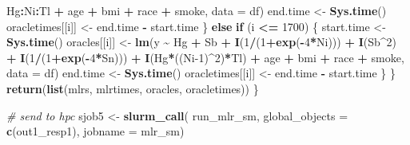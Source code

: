 \documentclass[12pt, twoside]{amherstthesis}
\newenvironment{Shaded}{\begin{snugshade}}{\end{snugshade}}
\newcommand{\AttributeTok}[1]{\textcolor[rgb]{0.13,0.29,0.53}{#1}}
\newcommand{\CommentTok}[1]{\textcolor[rgb]{0.56,0.35,0.01}{\textit{#1}}}
\newcommand{\ControlFlowTok}[1]{\textcolor[rgb]{0.13,0.29,0.53}{\textbf{#1}}}
\newcommand{\DecValTok}[1]{\textcolor[rgb]{0.00,0.00,0.81}{#1}}
\newcommand{\FunctionTok}[1]{\textcolor[rgb]{0.13,0.29,0.53}{\textbf{#1}}}
\newcommand{\NormalTok}[1]{#1}
\newcommand{\OtherTok}[1]{\textcolor[rgb]{0.56,0.35,0.01}{#1}}
\newcommand{\SpecialCharTok}[1]{\textcolor[rgb]{0.81,0.36,0.00}{\textbf{#1}}}
\newcommand{\StringTok}[1]{\textcolor[rgb]{0.31,0.60,0.02}{#1}}
\begin{document}
\begin{Shaded}
\begin{Highlighting}[]
\NormalTok{                           Hg}\SpecialCharTok{:}\NormalTok{Ni}\SpecialCharTok{:}\NormalTok{Tl }\SpecialCharTok{+} 
\NormalTok{                           age }\SpecialCharTok{+}\NormalTok{ bmi }\SpecialCharTok{+}\NormalTok{ race }\SpecialCharTok{+}\NormalTok{ smoke, }\AttributeTok{data =}\NormalTok{ df)}
\NormalTok{      end.time }\OtherTok{\textless{}{-}} \FunctionTok{Sys.time}\NormalTok{()}
\NormalTok{      oracletimes[[i]] }\OtherTok{\textless{}{-}}\NormalTok{ end.time }\SpecialCharTok{{-}}\NormalTok{ start.time}
\NormalTok{    \} }\ControlFlowTok{else} \ControlFlowTok{if}\NormalTok{ (i }\SpecialCharTok{\textless{}=} \DecValTok{1700}\NormalTok{) \{}
\NormalTok{      start.time }\OtherTok{\textless{}{-}} \FunctionTok{Sys.time}\NormalTok{()}
\NormalTok{      oracles[[i]] }\OtherTok{\textless{}{-}} \FunctionTok{lm}\NormalTok{(y }\SpecialCharTok{\textasciitilde{}}\NormalTok{ Hg }\SpecialCharTok{+}\NormalTok{ Sb }\SpecialCharTok{+}
                           \FunctionTok{I}\NormalTok{(}\DecValTok{1}\SpecialCharTok{/}\NormalTok{(}\DecValTok{1}\SpecialCharTok{+}\FunctionTok{exp}\NormalTok{(}\SpecialCharTok{{-}}\DecValTok{4}\SpecialCharTok{*}\NormalTok{Ni))) }\SpecialCharTok{+} \FunctionTok{I}\NormalTok{(Sb}\SpecialCharTok{\^{}}\DecValTok{2}\NormalTok{) }\SpecialCharTok{+} \FunctionTok{I}\NormalTok{(}\DecValTok{1}\SpecialCharTok{/}\NormalTok{(}\DecValTok{1}\SpecialCharTok{+}\FunctionTok{exp}\NormalTok{(}\SpecialCharTok{{-}}\DecValTok{4}\SpecialCharTok{*}\NormalTok{Sn))) }\SpecialCharTok{+}
                           \FunctionTok{I}\NormalTok{(Hg}\SpecialCharTok{*}\NormalTok{((Ni}\DecValTok{{-}1}\NormalTok{)}\SpecialCharTok{\^{}}\DecValTok{2}\NormalTok{)}\SpecialCharTok{*}\NormalTok{Tl) }\SpecialCharTok{+} 
\NormalTok{                           age }\SpecialCharTok{+}\NormalTok{ bmi }\SpecialCharTok{+}\NormalTok{ race }\SpecialCharTok{+}\NormalTok{ smoke, }\AttributeTok{data =}\NormalTok{ df)}
\NormalTok{      end.time }\OtherTok{\textless{}{-}} \FunctionTok{Sys.time}\NormalTok{()}
\NormalTok{      oracletimes[[i]] }\OtherTok{\textless{}{-}}\NormalTok{ end.time }\SpecialCharTok{{-}}\NormalTok{ start.time}
\NormalTok{    \}}
\NormalTok{  \}}
  \FunctionTok{return}\NormalTok{(}\FunctionTok{list}\NormalTok{(mlrs, mlrtimes, oracles, oracletimes))}
\NormalTok{\}}

\CommentTok{\# send to hpc}
\NormalTok{sjob5 }\OtherTok{\textless{}{-}} \FunctionTok{slurm\_call}\NormalTok{(}
\NormalTok{  run\_mlr\_sm, }
  \AttributeTok{global\_objects =} \FunctionTok{c}\NormalTok{(}\StringTok{\textquotesingle{}out1\_resp1\textquotesingle{}}\NormalTok{),}
  \AttributeTok{jobname =} \StringTok{\textquotesingle{}mlr\_sm\textquotesingle{}}\NormalTok{)}


\end{Highlighting}
\end{Shaded}
\end{document}
